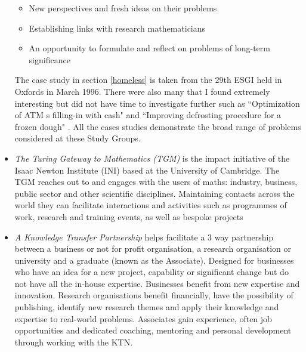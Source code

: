 \documentclass[11pt]{article} %
\begin{document}
\begin{itemize}
\begin{itemize}
			\item New perspectives and fresh ideas on their problems
			\item Establishing links with research mathematicians
			\item An opportunity to formulate and reflect on problems  of long-term significance
		\end{itemize}	
		The case study in section \ref{homeless} is taken from the 29th ESGI held in Oxfords in March 1996. There were also many that I found extremely interesting but did not have time to investigate further such as  ``Optimization of ATM s filling-in with cash" \cite{Broda} and ``Improving defrosting procedure for a frozen dough" \cite{Luci}. All the cases studies demonstrate the broad range of problems considered at these Study Groups. 
		\item \textit{The Turing Gateway to Mathematics (TGM)} is the impact initiative of the Isaac Newton Institute (INI) based at the University of Cambridge. The TGM reaches out to and engages with the users of maths: industry, business, public sector and other scientific disciplines. Maintaining contacts across the world they can facilitate interactions and activities such as programmes of work, research and training events, as well as bespoke projects
		\item  \textit{A Knowledge Transfer Partnership} helps facilitate a 3 way partnership between a business or not for profit organisation, a research organisation or university and a graduate (known as the Associate). Designed for businesses who have an idea for a new project, capability or significant change but  do not have all the in-house expertise. Businesses benefit from new expertise and innovation. Research organisations benefit financially, have the possibility of publishing, identify new research themes and apply their knowledge and expertise to real-world problems. Associates gain experience, often job opportunities and dedicated coaching, mentoring and personal development through working with the KTN.
		 
		
	
	\end{itemize}
\end{document}

